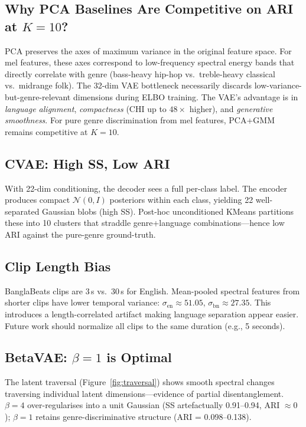 \documentclass{article}
\begin{document}
\subsection{Why PCA Baselines Are Competitive on ARI at $K\!=\!10$?}

PCA preserves the axes of maximum variance in the original feature space. For
mel features, these axes correspond to low-frequency spectral energy bands that
directly correlate with genre (bass-heavy hip-hop vs.\ treble-heavy classical vs.\
midrange folk). The 32-dim VAE bottleneck necessarily discards low-variance-but-genre-relevant
dimensions during ELBO training. The VAE's advantage is in \emph{language alignment},
\emph{compactness} (CHI up to $48\times$ higher), and \emph{generative smoothness}.
For pure genre discrimination from mel features, PCA+GMM remains competitive at $K\!=\!10$.

\subsection{CVAE: High SS, Low ARI}

With 22-dim conditioning, the decoder sees a full per-class label. The encoder
produces compact $\mathcal{N}(0,I)$ posteriors within each class, yielding 22
well-separated Gaussian blobs (high SS). Post-hoc unconditioned KMeans partitions
these into 10 clusters that straddle genre+language combinations---hence low ARI
against the pure-genre ground-truth.

\subsection{Clip Length Bias}
\label{sec:bias}

BanglaBeats clips are 3\,s vs.\ 30\,s for English.
Mean-pooled spectral features from shorter clips have lower temporal variance:
$\sigma_\text{en} \approx 51.05$, $\sigma_\text{bn} \approx 27.35$.
This introduces a length-correlated artifact making language separation appear easier.
Future work should normalize all clips to the same duration (e.g., 5 seconds).

\subsection{BetaVAE: $\beta\!=\!1$ is Optimal}

The latent traversal (Figure~\ref{fig:traversal}) shows smooth spectral changes
traversing individual latent dimensions---evidence of partial disentanglement.
$\beta\!=\!4$ over-regularises into a unit Gaussian (SS artefactually 0.91--0.94,
ARI $\approx 0$); $\beta\!=\!1$ retains genre-discriminative structure
(ARI = 0.098--0.138).
\end{document}

